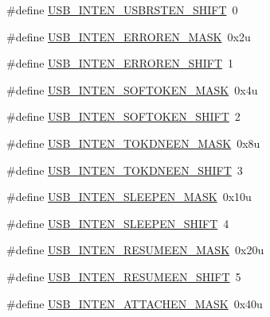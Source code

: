 \begin{DoxyCompactItemize}
\item 
\#define \hyperlink{group___u_s_b___register___masks_gaf3b53207fe24da42d123d8e94494b72f}{U\+S\+B\+\_\+\+I\+N\+T\+E\+N\+\_\+\+U\+S\+B\+R\+S\+T\+E\+N\+\_\+\+S\+H\+I\+FT}~0
\item 
\#define \hyperlink{group___u_s_b___register___masks_gaf660b76755baff6ed122be3eba21723b}{U\+S\+B\+\_\+\+I\+N\+T\+E\+N\+\_\+\+E\+R\+R\+O\+R\+E\+N\+\_\+\+M\+A\+SK}~0x2u
\item 
\#define \hyperlink{group___u_s_b___register___masks_ga38c74121b3660065935c4f639f987b3c}{U\+S\+B\+\_\+\+I\+N\+T\+E\+N\+\_\+\+E\+R\+R\+O\+R\+E\+N\+\_\+\+S\+H\+I\+FT}~1
\item 
\#define \hyperlink{group___u_s_b___register___masks_ga6398aff7e3278bea66900a35b616563f}{U\+S\+B\+\_\+\+I\+N\+T\+E\+N\+\_\+\+S\+O\+F\+T\+O\+K\+E\+N\+\_\+\+M\+A\+SK}~0x4u
\item 
\#define \hyperlink{group___u_s_b___register___masks_ga8d9738dcc6d852ffd09dbac5e8058431}{U\+S\+B\+\_\+\+I\+N\+T\+E\+N\+\_\+\+S\+O\+F\+T\+O\+K\+E\+N\+\_\+\+S\+H\+I\+FT}~2
\item 
\#define \hyperlink{group___u_s_b___register___masks_ga59b367a1e2496ad06deee9d86001aa7d}{U\+S\+B\+\_\+\+I\+N\+T\+E\+N\+\_\+\+T\+O\+K\+D\+N\+E\+E\+N\+\_\+\+M\+A\+SK}~0x8u
\item 
\#define \hyperlink{group___u_s_b___register___masks_ga2e0c8229886bcca7e35bee00cd90d236}{U\+S\+B\+\_\+\+I\+N\+T\+E\+N\+\_\+\+T\+O\+K\+D\+N\+E\+E\+N\+\_\+\+S\+H\+I\+FT}~3
\item 
\#define \hyperlink{group___u_s_b___register___masks_gac2cf7613141a7333e152b43e42e6ee53}{U\+S\+B\+\_\+\+I\+N\+T\+E\+N\+\_\+\+S\+L\+E\+E\+P\+E\+N\+\_\+\+M\+A\+SK}~0x10u
\item 
\#define \hyperlink{group___u_s_b___register___masks_ga8e3c25dd5e743c21fc277d45640d5a5e}{U\+S\+B\+\_\+\+I\+N\+T\+E\+N\+\_\+\+S\+L\+E\+E\+P\+E\+N\+\_\+\+S\+H\+I\+FT}~4
\item 
\#define \hyperlink{group___u_s_b___register___masks_ga9bcc213c102e47e0700cd463b9198470}{U\+S\+B\+\_\+\+I\+N\+T\+E\+N\+\_\+\+R\+E\+S\+U\+M\+E\+E\+N\+\_\+\+M\+A\+SK}~0x20u
\item 
\#define \hyperlink{group___u_s_b___register___masks_ga49c43d3fce5392a3d68780ebd02cb5df}{U\+S\+B\+\_\+\+I\+N\+T\+E\+N\+\_\+\+R\+E\+S\+U\+M\+E\+E\+N\+\_\+\+S\+H\+I\+FT}~5
\item 
\#define \hyperlink{group___u_s_b___register___masks_gada08eb0b0c86565a19f43a0c9fbf293b}{U\+S\+B\+\_\+\+I\+N\+T\+E\+N\+\_\+\+A\+T\+T\+A\+C\+H\+E\+N\+\_\+\+M\+A\+SK}~0x40u
\item 

\end{DoxyCompactItemize}
